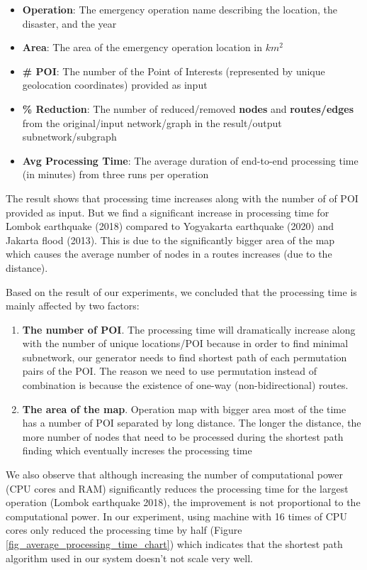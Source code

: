 \documentclass[conference]{IEEEtran}
\begin{document}
\begin{itemize}
\item \textbf{Operation}: The emergency operation name describing the location, the disaster, and the year
\item \textbf{Area}: The area of the emergency operation location in $km^2$
\item \textbf{\# POI}: The number of the Point of Interests (represented by unique geolocation coordinates) provided as input
\item \textbf{\% Reduction}: The number of reduced/removed \textbf{nodes} and \textbf{routes/edges} from the original/input network/graph in the result/output subnetwork/subgraph
\item \textbf{Avg Processing Time}: The average duration of end-to-end processing time (in minutes) from three runs per operation
\end{itemize}

The result shows that processing time increases along with the number of of POI provided as input. But we find a significant increase in processing time for Lombok earthquake (2018) compared to Yogyakarta earthquake (2020) and Jakarta flood (2013). This is due to the significantly bigger area of the map which causes the average number of nodes in a routes increases (due to the distance).

Based on the result of our experiments, we concluded that the processing time is mainly affected by two factors:

\begin{enumerate}
\item \textbf{The number of POI}. The processing time will dramatically increase along with the number of unique locations/POI because in order to find minimal subnetwork, our generator needs to find shortest path of each permutation pairs of the POI. The reason we need to use permutation instead of combination is because the existence of one-way (non-bidirectional) routes.
\item \textbf{The area of the map}. Operation map with bigger area most of the time has a number of POI separated by long distance. The longer the distance, the more number of nodes that need to be processed during the shortest path finding which eventually increses the processing time
\end{enumerate}

We also observe that although increasing the number of computational power (CPU cores and RAM) significantly reduces the processing time for the largest operation (Lombok earthquake 2018), the improvement is not proportional to the computational power. In our experiment, using machine with 16 times of CPU cores only reduced the processing time by half (Figure \ref{fig_average_processing_time_chart}) which indicates that the shortest path algorithm used in our system doesn't not scale very well.
\end{document}
